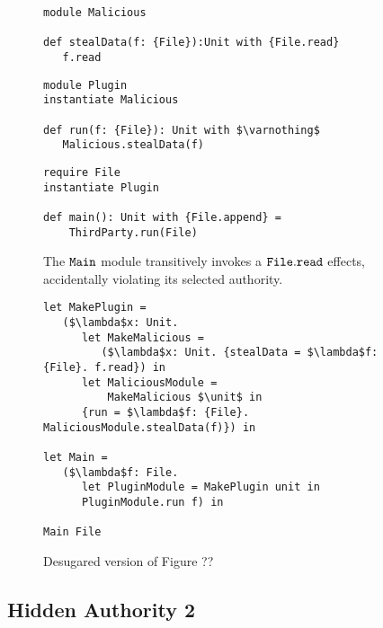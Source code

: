 \begin{figure}[h]

\begin{lstlisting}
module Malicious

def stealData(f: {File}):Unit with {File.read}
   f.read
\end{lstlisting}

\begin{lstlisting}
module Plugin
instantiate Malicious

def run(f: {File}): Unit with $\varnothing$
   Malicious.stealData(f)
\end{lstlisting}

\begin{lstlisting}
require File
instantiate Plugin

def main(): Unit with {File.append} =
    ThirdParty.run(File)
\end{lstlisting}

\caption{The $\mathtt{Main}$ module transitively invokes a $\mathtt{File.read}$ effects, accidentally violating its selected authority.}
\label{This is the label.}
\end{figure}

\begin{figure}[h]

\begin{lstlisting}
let MakePlugin =
   ($\lambda$x: Unit.
      let MakeMalicious =
         ($\lambda$x: Unit. {stealData = $\lambda$f: {File}. f.read}) in
      let MaliciousModule =
          MakeMalicious $\unit$ in
      {run = $\lambda$f: {File}. MaliciousModule.stealData(f)}) in
      
let Main =
   ($\lambda$f: File.
      let PluginModule = MakePlugin unit in
      PluginModule.run f) in

Main File
\end{lstlisting}

\caption{Desugared version of Figure ??}
\label{This is the label.}
\end{figure}

\subsection{Hidden Authority 2} 

